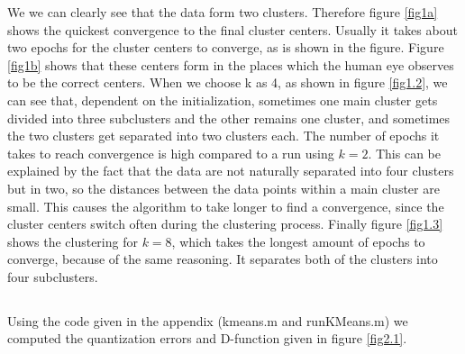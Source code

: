 \documentclass[10pt]{article}
\begin{document}
\noindent We we can clearly see that the data form two clusters. Therefore figure \ref{fig1a} shows the quickest convergence to the final cluster centers. Usually it takes about two epochs for the cluster centers to converge, as is shown in the figure. Figure \ref{fig1b} shows that these centers form in the places which the human eye observes to be the correct centers. When we choose k as 4, as shown in figure \ref{fig1.2}, we can see that, dependent on the initialization, sometimes one main cluster gets divided into three subclusters and the other remains one cluster, and sometimes the two clusters get separated into two clusters each. The number of epochs it takes to reach convergence is high compared to a run using $k=2$. This can be explained by the fact that the data are not naturally separated into four clusters but in two, so the distances between the data points within a main cluster are small. This causes the algorithm to take longer to find a convergence, since the cluster centers switch often during the clustering process. Finally figure \ref{fig1.3} shows the clustering for $k = 8$, which takes the longest amount of epochs to converge, because of the same reasoning. It separates both of the clusters into four subclusters. 

\subsection{}
Using the code given in the appendix (kmeans.m and runKMeans.m) we computed the quantization errors and D-function given in figure \ref{fig2.1}.
\end{document}

